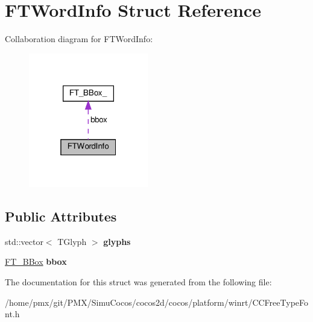 \hypertarget{structFTWordInfo}{}\section{F\+T\+Word\+Info Struct Reference}
\label{structFTWordInfo}


Collaboration diagram for F\+T\+Word\+Info\+:
\nopagebreak
\begin{figure}[H]
\begin{center}
\leavevmode
\includegraphics[width=148pt]{structFTWordInfo__coll__graph}
\end{center}
\end{figure}
\subsection*{Public Attributes}
\begin{DoxyCompactItemize}
\item 
\mbox{\label{structFTWordInfo_a98d49622d70a328cedff2396f7261762}} 
std\+::vector$<$ T\+Glyph $>$ {\bfseries glyphs}
\item 
\mbox{\label{structFTWordInfo_ada828faeb6ad3fd2483ec17666da7dfc}} 
\hyperlink{structFT__BBox__}{F\+T\+\_\+\+B\+Box} {\bfseries bbox}
\end{DoxyCompactItemize}


The documentation for this struct was generated from the following file\+:\begin{DoxyCompactItemize}
\item 
/home/pmx/git/\+P\+M\+X/\+Simu\+Cocos/cocos2d/cocos/platform/winrt/C\+C\+Free\+Type\+Font.\+h\end{DoxyCompactItemize}
